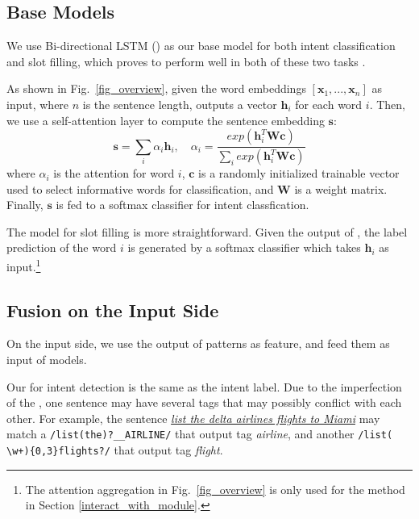 \subsection{Base Models}
We use Bi-directional LSTM (\BLSTM) as our base \NN model for both intent classification and slot filling, which proves to perform well in both of these two tasks \cite{liu2016attention}.

As shown in Fig.~\ref{fig_overview}, given the word embeddings $[\textbf{x}_1, ..., \textbf{x}_n]$ as input, where $n$ is the sentence length, \BLSTM outputs a vector $\textbf{h}_i$ for each word $i$.
Then, we use a self-attention layer to compute the sentence embedding $\textbf{s}$:
\begin{equation}
\textbf{s} = \sum_{i}{\alpha_i\textbf{h}_i}, \quad \alpha_i=\frac{exp(\textbf{h}_i^T\textbf{Wc})}{\sum_{i}{exp(\textbf{h}_i^T\textbf{Wc})}}
\label{eq:simple_att}
\end{equation}
where  $\alpha_i$ is the attention for word $i$, $\textbf{c}$ is a randomly initialized trainable vector used to select informative words for classification, and $\textbf{W}$ is a weight matrix.
Finally, $\textbf{s}$ is fed to a softmax classifier for intent classfication.

The model for slot filling is more straightforward. Given the output of \BLSTM, the label prediction of the word $i$ is generated by a
softmax classifier which takes $\textbf{h}_i$ as input.\footnote{The attention aggregation in Fig.~\ref{fig_overview} is only used for the
method in Section \ref{interact_with_module}.}


\subsection{Fusion on the Input Side}
\label{fusion_with_input}
On the input side, we use the output of \RE patterns as feature, and feed them as input of \NN models.

Our \REtag for intent detection is the same as the intent label.
Due to the imperfection of the \REs, one sentence may have several \RE tags that may possibly conflict with each other. For example, the
sentence \textsl{\underline{list the delta airlines flights to Miami}} may match a \RE \texttt{/list(\;the)?\;\_\_AIRLINE/} that output
tag \emph{airline}, and another \RE \texttt{/list(\,\textbackslash w+)\{0,3\}\;flights?/} that output tag \emph{flight}.

